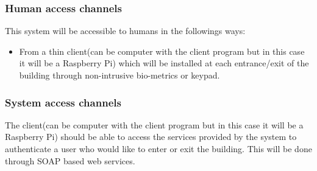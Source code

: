 \subsubsection{Human access channels}
This system will be accessible to humans in the followings ways:

	\begin{itemize}
		\item From a thin client(can be computer with the client program but in this case it will be a Raspberry Pi) which will be installed at each entrance/exit of the building through non-intrusive bio-metrics or keypad.
	\end{itemize}
	
\subsubsection{System access channels}
The client(can be computer with the client program but in this case it will be a Raspberry Pi) should be able to access the services provided by the system to authenticate a user who would like to enter or exit the building. This will be done through SOAP based web services.